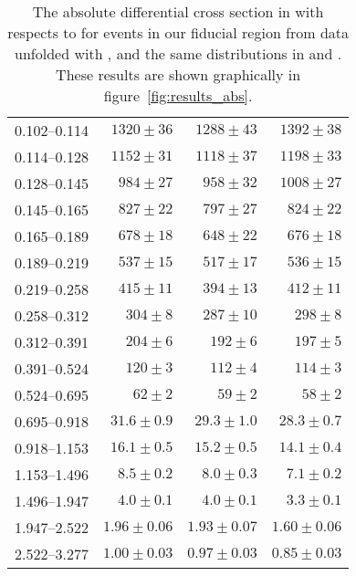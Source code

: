 \begin{table}
\begin{center}
\begin{tabular}{@{}l r r r@{}}
            0.102--0.114  &  $1320  \pm  36$    &  $1288  \pm  43$    &  $1392  \pm  38$    \\
            0.114--0.128  &  $1152  \pm  31$    &  $1118  \pm  37$    &  $1198  \pm  33$    \\
            0.128--0.145  &  $984   \pm  27$    &  $958   \pm  32$    &  $1008  \pm  27$    \\
            0.145--0.165  &  $827   \pm  22$    &  $797   \pm  27$    &  $824   \pm  22$    \\
            0.165--0.189  &  $678   \pm  18$    &  $648   \pm  22$    &  $676   \pm  18$    \\
            0.189--0.219  &  $537   \pm  15$    &  $517   \pm  17$    &  $536   \pm  15$    \\
            0.219--0.258  &  $415   \pm  11$    &  $394   \pm  13$    &  $412   \pm  11$    \\
            0.258--0.312  &  $304   \pm  8$     &  $287   \pm  10$    &  $298   \pm  8$     \\
            0.312--0.391  &  $204   \pm  6$     &  $192   \pm  6$     &  $197   \pm  5$     \\
            0.391--0.524  &  $120   \pm  3$     &  $112   \pm  4$     &  $114   \pm  3$     \\
            0.524--0.695  &  $62    \pm  2$     &  $59    \pm  2$     &  $58    \pm  2$     \\
            0.695--0.918  &  $31.6  \pm  0.9$   &  $29.3  \pm  1.0$   &  $28.3  \pm  0.7$   \\
            0.918--1.153  &  $16.1  \pm  0.5$   &  $15.2  \pm  0.5$   &  $14.1  \pm  0.4$   \\
            1.153--1.496  &  $8.5   \pm  0.2$   &  $8.0   \pm  0.3$   &  $7.1   \pm  0.2$   \\
            1.496--1.947  &  $4.0   \pm  0.1$   &  $4.0   \pm  0.1$   &  $3.3   \pm  0.1$   \\
            1.947--2.522  &  $1.96  \pm  0.06$  &  $1.93  \pm  0.07$  &  $1.60  \pm  0.06$  \\
            2.522--3.277  &  $1.00  \pm  0.03$  &  $0.97  \pm  0.03$  &  $0.85  \pm  0.03$  \\
            \bottomrule
        \end{tabular}
    \end{center}
    \caption[
        The absolute differential cross section in \pb with respects to
        \phistar for \Ztoee events in our fiducial region from data unfolded
        with \MADGRAPH.
    ]{
        The absolute differential cross section in \pb with respects to
        \phistar for \Ztoee events in our fiducial region from data unfolded
        with \MADGRAPH, and the same distributions in \MADGRAPH and \POWHEG.
        These results are shown graphically in figure~\ref{fig:results_abs}.
    }
    \label{tab:results_abs}
\end{table}
